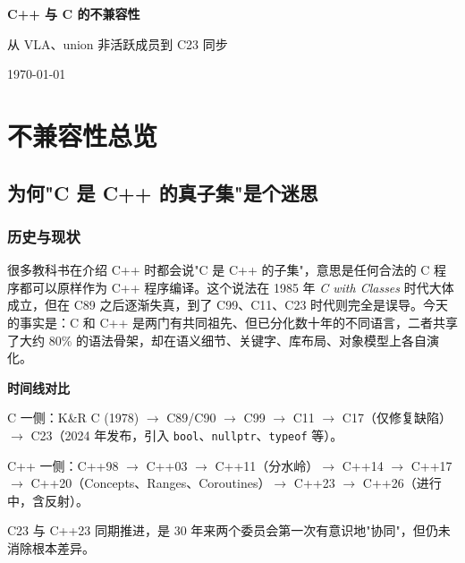 \documentclass[12pt,a4paper,fontset=fandol]{ctexbook}
\newcommand{\cpp}[1]{C++#1}
\newcommand{\kw}[1]{\texttt{#1}}
\begin{document}
\frontmatter

\begin{titlepage}
\centering
\vspace*{4cm}
{\Huge\bfseries C++ 与 C 的不兼容性\par}
\vspace{1cm}
{\LARGE 从 VLA、union 非活跃成员到 C23 同步\par}
\vfill
{\large \today\par}
\end{titlepage}

\tableofcontents

\mainmatter

\part{不兼容性总览}

\chapter{为何"C 是 C++ 的真子集"是个迷思}

\section{历史与现状}

很多教科书在介绍 \cpp{} 时都会说"C 是 \cpp{} 的子集"，意思是任何合法的 C 程序都可以原样作为 \cpp{} 程序编译。这个说法在 1985 年 \textit{C with Classes} 时代大体成立，但在 C89 之后逐渐失真，到了 C99、C11、C23 时代则完全是误导。今天的事实是：C 和 \cpp{} 是两门有共同祖先、但已分化数十年的不同语言，二者共享了大约 80\% 的语法骨架，却在语义细节、关键字、库布局、对象模型上各自演化。

\begin{compare}
\textbf{时间线对比}

C 一侧：K\&R C (1978) $\to$ C89/C90 $\to$ C99 $\to$ C11 $\to$ C17（仅修复缺陷）$\to$ C23（2024 年发布，引入 \kw{bool}、\kw{nullptr}、\kw{typeof} 等）。

\cpp{} 一侧：C++98 $\to$ C++03 $\to$ C++11（分水岭）$\to$ C++14 $\to$ C++17 $\to$ C++20（Concepts、Ranges、Coroutines）$\to$ C++23 $\to$ C++26（进行中，含反射）。

C23 与 C++23 同期推进，是 30 年来两个委员会第一次有意识地"协同"，但仍未消除根本差异。
\end{compare}
\end{document}
